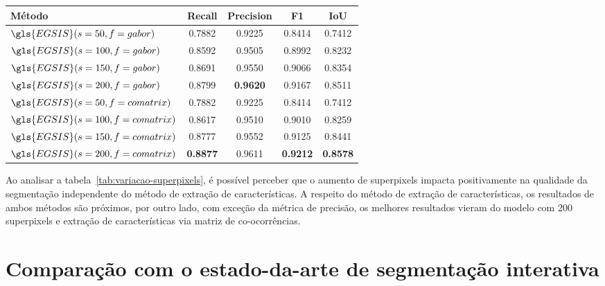 \begin{table}[!h]
    \centering
  \begin{tabular}{lcccc}
    \toprule
    \textbf{Método}                  & \textbf{Recall} & \textbf{Precision} & \textbf{F1}     & \textbf{IoU}    \\
    \midrule \midrule
    $\gls{EGSIS}(s=50, f=gabor)$     & 0.7882          & 0.9225             & 0.8414          & 0.7412          \\
    $\gls{EGSIS}(s=100, f=gabor)$    & 0.8592          & 0.9505             & 0.8992          & 0.8232          \\
    $\gls{EGSIS}(s=150, f=gabor)$    & 0.8691          & 0.9550             & 0.9066          & 0.8354          \\
    $\gls{EGSIS}(s=200, f=gabor)$    & 0.8799          & \textbf{0.9620}    & 0.9167          & 0.8511          \\
    $\gls{EGSIS}(s=50, f=comatrix)$  & 0.7882          & 0.9225             & 0.8414          & 0.7412          \\
    $\gls{EGSIS}(s=100, f=comatrix)$ & 0.8617          & 0.9510             & 0.9010          & 0.8259          \\
    $\gls{EGSIS}(s=150, f=comatrix)$ & 0.8777          & 0.9552             & 0.9125          & 0.8441          \\
    $\gls{EGSIS}(s=200, f=comatrix)$ & \textbf{0.8877} & 0.9611             & \textbf{0.9212} & \textbf{0.8578} \\
    \bottomrule
  \end{tabular}
  \Fonte{\fonteautor}
\end{table}

Ao analisar a tabela~\ref{tab:variacao-superpixels}, é possível
perceber que o aumento de superpixels impacta positivamente na
qualidade da segmentação independente do método de extração de
características. A respeito do método de extração de características,
os resultados de ambos métodos são próximos, por outro lado, com
exceção da métrica de precisão, os melhores resultados vieram do
modelo com 200 superpixels e extração de características via matriz de
co-ocorrências.

\section{Comparação com o estado-da-arte de segmentação interativa}\label{sec:comparacao-estado-da-arte}

